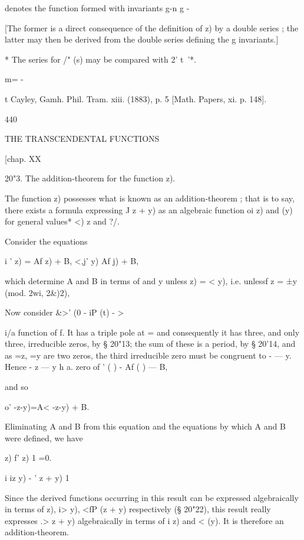 {denotes the function formed with invariants g-n g - 

[The former is a direct consequence of the definition of    z) by a double series ; the 
latter may then be derived from the double series defining the g invariants.] 

* The series for /" (s) may be compared with 2'  t~'*. 

m= -   

t Cayley, Gamh. Phil. Tram. xiii. (1883), p. 5 [Math. Papers, xi. p. 148]. 



440 



THE TRANSCENDENTAL FUNCTIONS 



[chap. XX 



20"3. The addition-theorem for the function   z). 

The function    z) possesses what is known as an addition-theorem ; that 
is to say, there exists a formula expressing  J  z + y) as an algebraic function 
oi  z) and  (y) for general values* <)  z and ?/. 

Consider the equations 

i ' z) = Af z) + B, <,j' y) Af  j) + B, 

which determine A and B in terms of   and y unless   z) = <  y), i.e. unlessf 
z = ±y (mod. 2wi, 2\&)2), 

Now consider \&>' (0 -  iP (t) -  > 

 i/a function of f. It has a triple pole at   = and consequently it has 
three, and only three, irreducible zeros, by § 20"13; the sum of these is a 
period, by § 20'14, and as  =z,  =y are two zeros, the third irreducible zero 
must be congruent to -   — y. Hence - z — y h a. zero of  ' ( ) - Af ( ) — B, 

and so 

 o' -z-y)=A<  -z-y) + B. 

Eliminating A and B from this equation and the equations by which A 
and B were defined, we have 

  z) f' z) 1 =0. 

i iz y) - ' z + y) 1 

Since the derived functions occurring in this result can be expressed 
algebraically in terms of    z),  i>  y), <fP (z + y) respectively (§ 20"22), this 
result really expresses  .>  z + y) algebraically in terms of i   z) and <  (y). 
It is therefore an addition-theorem. 

}
